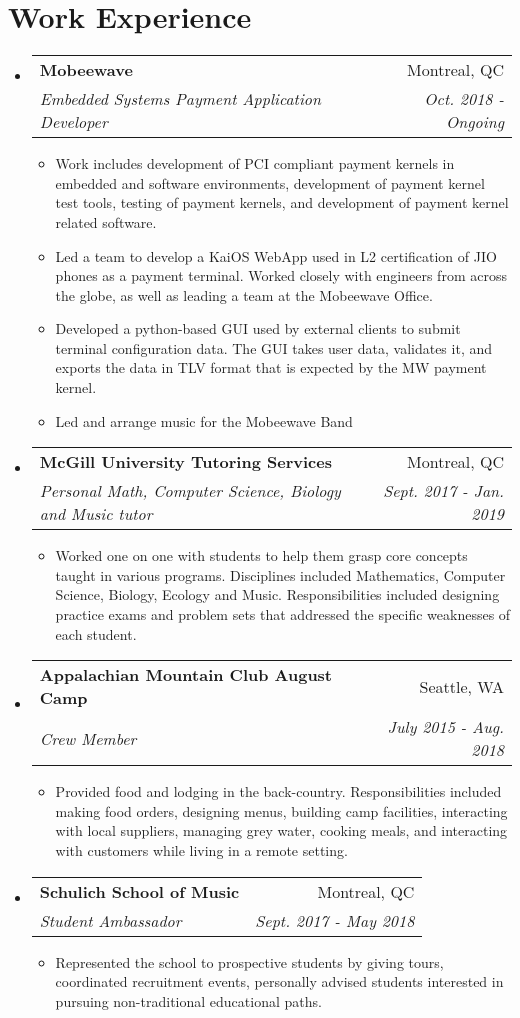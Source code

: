 \documentclass[letterpaper,11pt]{article}
\makeatletter
\newcommand{\resitem}[1]{\item #1 \vspace{-2pt}}
\newcommand{\ressubheading}[4]{
\begin{tabular*}{6.1in}{l@{\extracolsep{\fill}}r}
		\textbf{#1} & #2 \\
		\textit{#3} & \textit{#4} \\
\end{tabular*}\vspace{-1pt}}
\makeatother
\begin{document}
\section*{Work Experience}
\begin{itemize}
\item
	\ressubheading{Mobeewave}{Montreal, QC}{Embedded Systems Payment Application Developer}{Oct. 2018 - Ongoing}
	\begin{itemize}
		\resitem{Work includes development of PCI compliant payment kernels in embedded and software environments, development of payment kernel test tools, testing of payment kernels, and development of payment kernel related software.}
		\resitem{Led a team to develop a KaiOS WebApp used in L2 certification of JIO phones as a payment terminal. Worked closely with engineers from across the globe, as well as leading a team at the Mobeewave Office.}
		\resitem{Developed a python-based GUI used by external clients to submit terminal configuration data. The GUI takes user data, validates it, and exports the data in TLV format that is expected by the MW payment kernel.}
		\resitem{Led and arrange music for the Mobeewave Band}
	\end{itemize}
	
\item
	\ressubheading{McGill University Tutoring Services}{Montreal, QC}{Personal Math, Computer Science, Biology and Music tutor}{Sept. 2017 - Jan. 2019}
	\begin{itemize}
		\resitem{Worked one on one with students to help them grasp core concepts taught in various programs. Disciplines included Mathematics, Computer Science, Biology, Ecology and Music. Responsibilities included designing practice exams and problem sets that addressed the specific weaknesses of each student.}
	\end{itemize}

\item 
	\ressubheading{Appalachian Mountain Club August Camp}{Seattle, WA}{Crew Member}{July 2015 - Aug. 2018}
	\begin{itemize}
		\resitem{Provided food and lodging in the back-country. Responsibilities included making food orders, designing menus, building camp facilities, interacting with local suppliers, managing grey water, cooking meals, and interacting with customers while living in a remote setting.}
	\end{itemize}

\item
	\ressubheading{Schulich School of Music}{Montreal, QC}{Student Ambassador}{Sept. 2017 - May 2018}
	\begin{itemize}
		\resitem{Represented the school to prospective students by giving tours, coordinated recruitment events, personally advised students interested in pursuing non-traditional educational paths.}
	\end{itemize}


\end{itemize}
\end{document}
